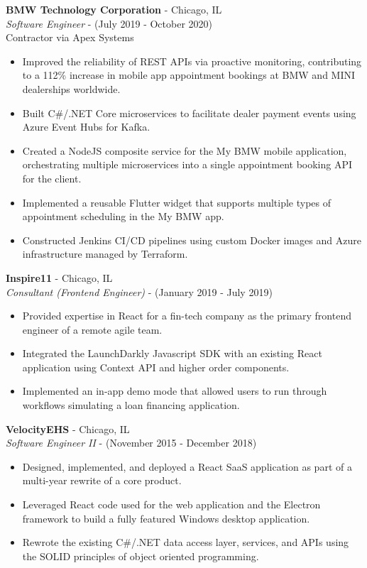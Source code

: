 \documentclass[10pt]{article}
\begin{document}
\begin{paracol}{2}
    \noindent \textbf{BMW Technology Corporation} - Chicago, IL \\
    \textit{Software Engineer} - {\footnotesize{(July 2019 - October 2020)}} \\
    {\footnotesize{Contractor via Apex Systems}}
    \begin{itemize}
        \item Improved the reliability of REST APIs via proactive monitoring, contributing to a 112\% increase in mobile app appointment bookings at BMW and MINI dealerships worldwide.
        \item Built C\#/.NET Core microservices to facilitate dealer payment events using Azure Event Hubs for Kafka.
        \item Created a NodeJS composite service for the My BMW mobile application, orchestrating multiple microservices into a single appointment booking API for the client.
        \item Implemented a reusable Flutter widget that supports multiple types of appointment scheduling in the My BMW app.
        \item Constructed Jenkins CI/CD pipelines using custom Docker images and Azure infrastructure managed by Terraform.
    \end{itemize}


    \noindent \textbf{Inspire11} - Chicago, IL \\
    \textit{Consultant (Frontend Engineer)} - {\footnotesize{(January 2019 - July 2019)}}
    \begin{itemize}
        \item Provided expertise in React for a fin-tech company as the primary frontend engineer of a remote agile team.
        \item Integrated the LaunchDarkly Javascript SDK with an existing React application using Context API and higher order components.
        \item Implemented an in-app demo mode that allowed users to run through workflows simulating a loan financing application.
    \end{itemize}

    \noindent \textbf{VelocityEHS} - Chicago, IL \\
    \textit{Software Engineer II} - {\footnotesize{(November 2015 - December 2018)}}
    \begin{itemize}
        \item Designed, implemented, and deployed a React SaaS application as part of a multi-year rewrite of a core product.
        \item Leveraged React code used for the web application and the Electron framework to build a fully featured Windows desktop application.
        \item Rewrote the existing C\#/.NET data access layer, services, and APIs using the SOLID principles of object oriented programming.
    \end{itemize}


\end{paracol}
\end{document}
